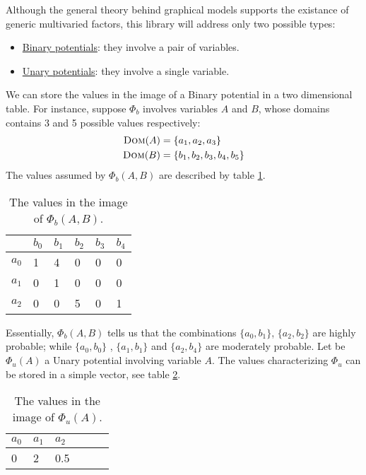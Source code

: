 Although the general theory behind graphical models supports the existance of generic multivaried factors, this library will address only two possible types:
\begin{itemize}
\item \underline{Binary potentials}: they involve a pair of variables.
\item \underline{Unary potentials}: they involve a single variable.
\end{itemize}

We can store the values in the image of a Binary potential in a two dimensional table. For instance, suppose $\Phi _b$ involves variables $A$ and $B$, whose domains contains 3 and 5 possible values respectively:
\begin{eqnarray}
\textsc{Dom}(A) &= \lbrace a_1, a_2, a_3 \rbrace \nonumber\\
\textsc{Dom}(B) &= \lbrace b_1, b_2, b_3, b_4, b_5 \rbrace
 \end{eqnarray} 
The values assumed by $\Phi _b(A,B)$ are described by table \ref{tab:00:t1}.
\begin{table}[]
\centering
\begin{tabular}{l|l|l|l|l|l|}
      & $b_0$ & $b_1$ & $b_2$ & $b_3$ & $b_4$ \\
      \hline
$a_0$ & 1     & 4     & 0     & 0     & 0     \\
\hline
$a_1$ & 0     & 1     & 0     & 0     & 0     \\
\hline
$a_2$ & 0     & 0     & 5     & 0     & 1   \\
\hline 
\end{tabular}
\caption{The values in the image of $\Phi _b(A,B)$.} 
\label{tab:00:t1}
\end{table}
Essentially,  $\Phi _b(A,B)$ tells us that the combinations $\lbrace a_0, b_1 \rbrace$, $\lbrace a_2, b_2 \rbrace$ are highly probable; while $\lbrace a_0, b_0 \rbrace$ , $\lbrace a_1, b_1 \rbrace$ and $\lbrace a_2, b_4 \rbrace$ are moderately probable.
Let be $\Phi _u(A)$ a Unary potential involving variable $A$. The values characterizing $\Phi _u$ can be stored in a simple vector, see table \ref{tab:00:t2}.
\begin{table}[]
\centering
\begin{tabular}{l|l|l|l|l|l}
 $a_0$ & $a_1$ & $a_2$  \\
 \hline
 0     & 2     & 0.5  \\
\hline
\end{tabular}
\caption{The values in the image of $\Phi _u(A)$.} 
\label{tab:00:t2}
\end{table}
